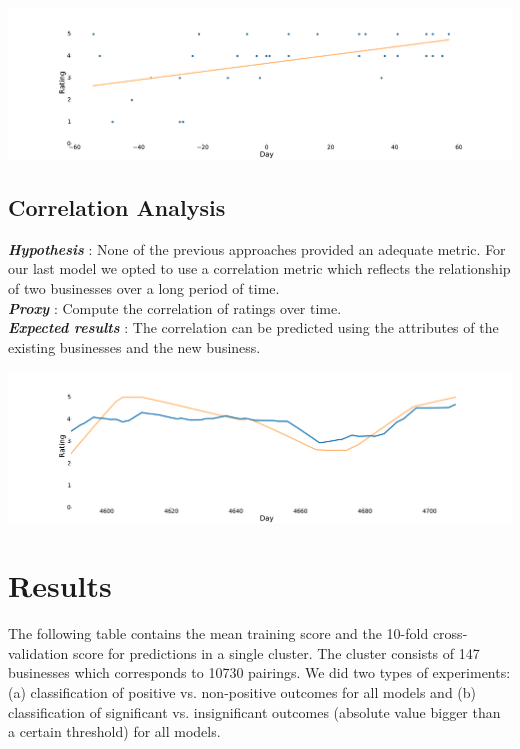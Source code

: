\documentclass[a0,landscape,beamer]{a0poster}
\begin{document}
\begin{multicols}{4}
\begin{center}
\includegraphics[width=\linewidth]{../gen_trend.pdf}
\end{center}

\subsection*{Correlation Analysis}
\textbf{\textit{Hypothesis}} : None of the previous approaches provided an adequate metric.
For our last model we opted to use a correlation metric which reflects the relationship of two businesses over a long period of time.\\
\textbf{\textit{Proxy}} : Compute the correlation of ratings over time.\\
\textbf{\textit{Expected results}} : The correlation can be predicted using the attributes of the existing businesses and the new business. 

\begin{center}
\includegraphics[width=\linewidth]{../corr.pdf}
\end{center}


\section*{Results}
%
The following table contains the mean training score and the 10-fold cross-validation score for predictions in a single cluster.
The cluster consists of 147 businesses which corresponds to 10730 pairings.
We did two types of experiments: (a) classification of positive vs. non-positive outcomes for all models and (b) classification of significant vs. insignificant outcomes (absolute value bigger than a certain threshold) for all models.


\end{multicols}
\end{document}
